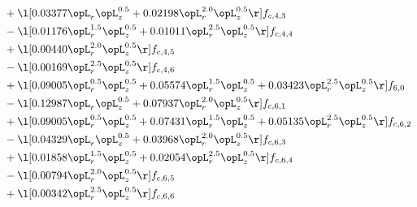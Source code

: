 \begin{alignat}{2}
& + \l[  0.03377 \opL_r \opL_z^{0.5} +  0.02198 \opL_r^{2.0} \opL_z^{0.5}  \r] f_{c,4,3} \nonumber \\ 
& - \l[  0.01176 \opL_r^{1.5} \opL_z^{0.5} +  0.01011 \opL_r^{2.5} \opL_z^{0.5}  \r] f_{c,4,4} \nonumber \\ 
& + \l[  0.00440 \opL_r^{2.0} \opL_z^{0.5}  \r] f_{c,4,5} \nonumber \\ 
& - \l[  0.00169 \opL_r^{2.5} \opL_z^{0.5}  \r] f_{c,4,6} \nonumber \\ 
& + \l[  0.09005 \opL_r^{0.5} \opL_z^{0.5} +  0.05574 \opL_r^{1.5} \opL_z^{0.5} +  0.03423 \opL_r^{2.5} \opL_z^{0.5}  \r] f_{6,0} \nonumber \\ 
& - \l[  0.12987 \opL_r \opL_z^{0.5} +  0.07937 \opL_r^{2.0} \opL_z^{0.5}  \r] f_{c,6,1} \nonumber \\ 
& + \l[  0.09005 \opL_r^{0.5} \opL_z^{0.5} +  0.07431 \opL_r^{1.5} \opL_z^{0.5} +  0.05135 \opL_r^{2.5} \opL_z^{0.5}  \r] f_{c,6,2} \nonumber \\ 
& - \l[  0.04329 \opL_r \opL_z^{0.5} +  0.03968 \opL_r^{2.0} \opL_z^{0.5}  \r] f_{c,6,3} \nonumber \\ 
& + \l[  0.01858 \opL_r^{1.5} \opL_z^{0.5} +  0.02054 \opL_r^{2.5} \opL_z^{0.5}  \r] f_{c,6,4} \nonumber \\ 
& - \l[  0.00794 \opL_r^{2.0} \opL_z^{0.5}  \r] f_{c,6,5} \nonumber \\ 
& + \l[  0.00342 \opL_r^{2.5} \opL_z^{0.5}  \r] f_{c,6,6} \nonumber \\ 
\end{alignat} 


